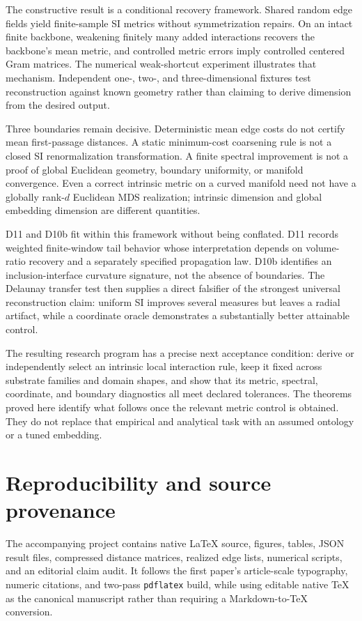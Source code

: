 \documentclass[11pt,letterpaper]{article}
\theoremstyle{definition}
\theoremstyle{remark}
\begin{document}
The constructive result is a conditional recovery framework. Shared random edge fields yield finite-sample SI metrics without symmetrization repairs. On an intact finite backbone, weakening finitely many added interactions recovers the backbone's mean metric, and controlled metric errors imply controlled centered Gram matrices. The numerical weak-shortcut experiment illustrates that mechanism. Independent one-, two-, and three-dimensional fixtures test reconstruction against known geometry rather than claiming to derive dimension from the desired output.

Three boundaries remain decisive. Deterministic mean edge costs do not certify mean first-passage distances. A static minimum-cost coarsening rule is not a closed SI renormalization transformation. A finite spectral improvement is not a proof of global Euclidean geometry, boundary uniformity, or manifold convergence. Even a correct intrinsic metric on a curved manifold need not have a globally rank-$d$ Euclidean MDS realization; intrinsic dimension and global embedding dimension are different quantities.

D11 and D10b fit within this framework without being conflated. D11 records weighted finite-window tail behavior whose interpretation depends on volume-ratio recovery and a separately specified propagation law. D10b identifies an inclusion-interface curvature signature, not the absence of boundaries. The Delaunay transfer test then supplies a direct falsifier of the strongest universal reconstruction claim: uniform SI improves several measures but leaves a radial artifact, while a coordinate oracle demonstrates a substantially better attainable control.

The resulting research program has a precise next acceptance condition: derive or independently select an intrinsic local interaction rule, keep it fixed across substrate families and domain shapes, and show that its metric, spectral, coordinate, and boundary diagnostics all meet declared tolerances. The theorems proved here identify what follows once the relevant metric control is obtained. They do not replace that empirical and analytical task with an assumed ontology or a tuned embedding.

\appendix
\section{Reproducibility and source provenance}\label{app:repro}
The accompanying project contains native \LaTeX{} source, figures, tables, JSON result files, compressed distance matrices, realized edge lists, numerical scripts, and an editorial claim audit. It follows the first paper's article-scale typography, numeric citations, and two-pass \texttt{pdflatex} build, while using editable native \TeX{} as the canonical manuscript rather than requiring a Markdown-to-\TeX{} conversion.
\end{document}
